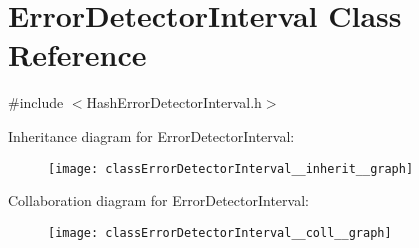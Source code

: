 \hypertarget{classErrorDetectorInterval}{}\section{Error\+Detector\+Interval Class Reference}
\label{classErrorDetectorInterval}


{\ttfamily \#include $<$Hash\+Error\+Detector\+Interval.\+h$>$}



Inheritance diagram for Error\+Detector\+Interval\+:\nopagebreak
\begin{figure}[H]
\begin{center}
\leavevmode
\texttt{[image: classErrorDetectorInterval\_\_inherit\_\_graph]}
\end{center}
\end{figure}


Collaboration diagram for Error\+Detector\+Interval\+:\nopagebreak
\begin{figure}[H]
\begin{center}
\leavevmode
\texttt{[image: classErrorDetectorInterval\_\_coll\_\_graph]}
\end{center}
\end{figure}
